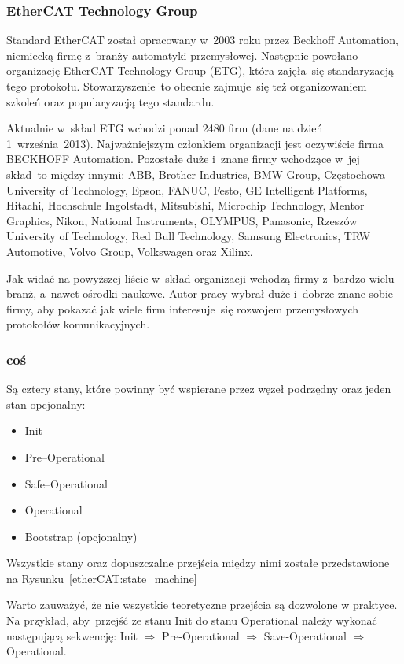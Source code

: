\subsubsection{EtherCAT Technology Group}

Standard EtherCAT został opracowany w~2003 roku przez Beckhoff Automation, niemiecką firmę z~branży automatyki przemysłowej. Następnie powołano organizację EtherCAT Technology Group (ETG), która zajęła~się standaryzacją tego protokołu. Stowarzyszenie~to obecnie zajmuje~się też organizowaniem szkoleń oraz popularyzacją tego standardu. 

Aktualnie w~skład ETG wchodzi ponad 2480 firm (dane na dzień 1~września~2013). Najważniejszym członkiem organizacji jest oczywiście firma BECKHOFF Automation. Pozostałe duże i~znane firmy wchodzące w~jej skład~to między innymi: ABB, Brother Industries, BMW Group, Częstochowa University of Technology, Epson, FANUC, Festo, GE Intelligent Platforms, Hitachi, Hochschule Ingolstadt, Mitsubishi, Microchip Technology, Mentor Graphics, Nikon, National Instruments, OLYMPUS, Panasonic, Rzeszów University of Technology, Red Bull Technology, Samsung Electronics, TRW Automotive, Volvo Group, Volkswagen oraz Xilinx.

Jak widać na powyższej liście w~skład organizacji wchodzą firmy z~bardzo wielu branż, a~nawet ośrodki naukowe. Autor pracy wybrał duże i~dobrze znane sobie firmy, aby pokazać jak wiele firm interesuje~się rozwojem przemysłowych protokołów komunikacyjnych.

\subsubsection{coś}
Są cztery stany, które powinny być wspierane przez węzeł podrzędny oraz jeden stan opcjonalny:
\begin{itemize}
\item Init
\item Pre--Operational
\item Safe--Operational
\item Operational
\item Bootstrap (opcjonalny)
\end{itemize}

Wszystkie stany oraz dopuszczalne przejścia między nimi zostałe przedstawione na Rysunku~\ref{etherCAT:state_machine}

Warto zauważyć, że nie wszystkie teoretyczne przejścia są dozwolone w praktyce. Na przykład, aby~przejść ze stanu Init do stanu Operational należy wykonać następującą sekwencję:
Init $\Rightarrow$ Pre-Operational $\Rightarrow$ Save-Operational $\Rightarrow$ Operational.

